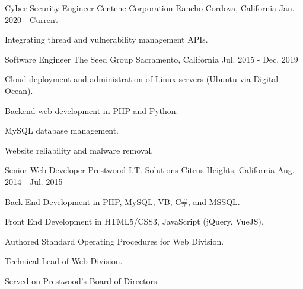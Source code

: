 

\begin{cventries}

  \cventry
    {Cyber Security Engineer} %
    {Centene Corporation} %
    {Rancho Cordova, California} %
    {Jan. 2020 - Current} %
    {
      \begin{cvitems} %
        \item {Integrating thread and vulnerability management APIs.}
      \end{cvitems}
    }



  \cventry
    {Software Engineer} %
    {The Seed Group} %
    {Sacramento, California} %
    {Jul. 2015 - Dec. 2019} %
    {
      \begin{cvitems} %
        \item {Cloud deployment and administration of Linux servers (Ubuntu via Digital Ocean).}
        \item {Backend web development in PHP and Python.}
        \item {MySQL database management.}
        \item {Website reliability and malware removal.}
      \end{cvitems}
    }


  \cventry
    {Senior Web Developer} %
    {Prestwood I.T. Solutions} %
    {Citrus Heights, California} %
    {Aug. 2014 - Jul. 2015} %
    {
      \begin{cvitems} %
        \item {Back End Development in PHP, MySQL, VB, C\#, and MSSQL.}
        \item {Front End Development in HTML5/CSS3, JavaScript (jQuery, VueJS). }
        \item {Authored Standard Operating Procedures for Web Division.}
        \item {Technical Lead of Web Division.}
        \item {Served on Prestwood's Board of Directors.}
      \end{cvitems}
    }


\end{cventries}

